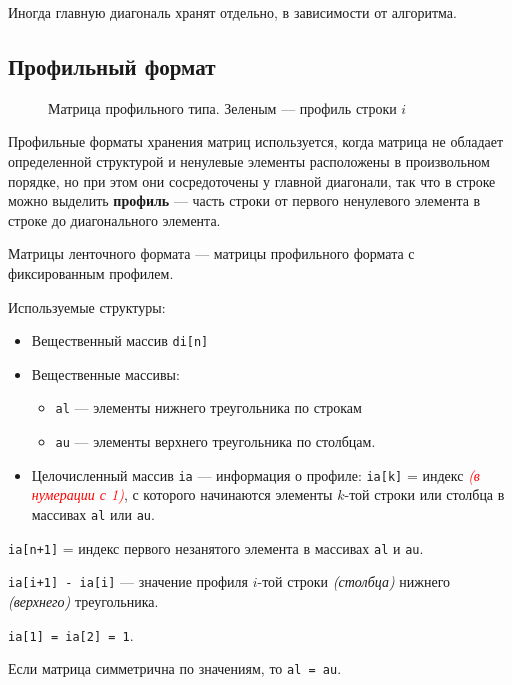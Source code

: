Иногда главную диагональ хранят отдельно, в зависимости от алгоритма.

\pagebreak

\subsection{Профильный формат}

\begin{wrapfigure}{R}{0.5\textwidth}
    \centering
    
    \caption{Матрица профильного типа. Зеленым --- профиль строки \(i\)}
\end{wrapfigure}
Профильные форматы хранения матриц используется, когда матрица не
обладает определенной структурой и ненулевые элементы расположены в произвольном порядке, но при этом они сосредоточены у главной диагонали, так что в строке можно выделить \textbf{профиль} --- часть строки от первого ненулевого элемента в строке до диагонального элемента.

Матрицы ленточного формата --- матрицы профильного формата с фиксированным профилем.

\pagebreak

Используемые структуры:
\begin{itemize}
    \item Вещественный массив \texttt{di[n]}
    \item Вещественные массивы:
          \begin{itemize}
              \item \texttt{al} --- элементы нижнего треугольника по строкам
              \item \texttt{au} --- элементы верхнего треугольника по столбцам.
          \end{itemize}
    \item Целочисленный массив \texttt{ia} --- информация о профиле: \texttt{ia[k]} = индекс \textcolor{red}{\textit{(в нумерации с 1)}}, с которого начинаются элементы \(k\)-той строки или столбца в массивах \texttt{al} или \texttt{au}.
\end{itemize}

\texttt{ia[n+1]} = индекс первого незанятого элемента в массивах \texttt{al} и \texttt{au}.

\texttt{ia[i+1] - ia[i]} --- значение профиля \(i\)-той строки \textit{(столбца)} нижнего \textit{(верхнего)} треугольника.

\texttt{ia[1] = ia[2] = 1}.

\begin{remark}
    Если матрица симметрична по значениям, то \texttt{al = au}.
\end{remark}

